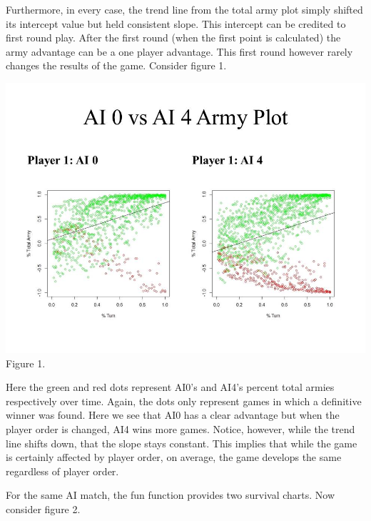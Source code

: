 \documentclass[12pt]{article}  %
\begin{document}
Furthermore, in every case, the trend line from the total army plot simply shifted its intercept value but held consistent slope. This intercept can be credited to first round play. After the first round (when the first point is calculated) the army advantage can be a one player advantage. This first round however rarely changes the results of the game. Consider figure 1. 

\begin{center}
\includegraphics[scale=0.6]{images/Figure_1.jpg}\\
{\footnotesize Figure 1.}
\end{center}

Here the green and red dots represent AI0’s and AI4’s percent total armies respectively over time. Again, the dots only represent games in which a definitive winner was found. Here we see that AI0 has a clear advantage but when the player order is changed, AI4 wins more games. Notice, however, while the trend line shifts down, that the slope stays constant. This implies that while the game is certainly affected by player order, on average, the game develops the same regardless of player order. 

For the same AI match, the fun function provides two survival charts. Now consider figure 2. 
\end{document}
